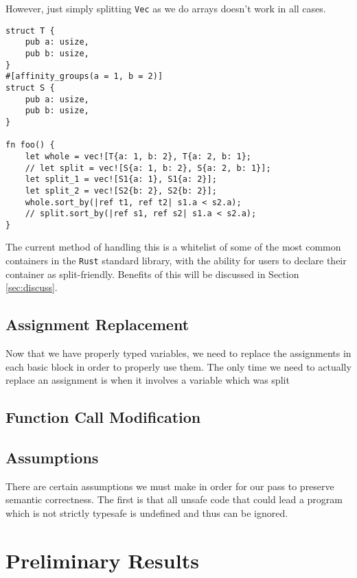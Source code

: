 \documentclass[12pt,oneside]{book}
\newcommand{\rustname}{{\texttt{Rust}}}
\def \rust {\rustname{}\xspace}
\newcommand{\vecname}{{\texttt{Vec}}}
\def \vec{\vecname{}\xspace}
\begin{document}

However, just simply splitting \vec as we do arrays doesn't work
in all cases.

\begin{float}
\begin{verbatim}
struct T {
	pub a: usize,
	pub b: usize,
}
#[affinity_groups(a = 1, b = 2)]
struct S {
	pub a: usize,
	pub b: usize,
}

fn foo() {
	let whole = vec![T{a: 1, b: 2}, T{a: 2, b: 1};
	// let split = vec![S{a: 1, b: 2}, S{a: 2, b: 1}];
	let split_1 = vec![S1{a: 1}, S1{a: 2}];
	let split_2 = vec![S2{b: 2}, S2{b: 2}];
	whole.sort_by(|ref t1, ref t2| s1.a < s2.a);
	// split.sort_by(|ref s1, ref s2| s1.a < s2.a);
}
\end{verbatim}
\caption{Splitting \vec \texttt{sort\_by}}
\end{float}
The current method of handling this is a whitelist of some of the most common containers in the \rust standard library, 
with the ability for users to declare their container as split-friendly.  
Benefits of this will be discussed in Section \ref{sec:discuss}.


\section{Assignment Replacement}
\label{sec:assign}

Now that we have properly typed variables, we need to replace the assignments
in each basic block in order to properly use them. The only time we need
to actually replace an assignment is when it involves a variable which was
split 

\section{Function Call Modification}
\label{sec:func}


\section{Assumptions}
There are certain assumptions we must make in order for our pass to 
preserve semantic correctness. The first is that all unsafe code that 
could lead a program which is not strictly typesafe is undefined and thus
can be ignored.

\chapter{Preliminary Results}
\end{document}
